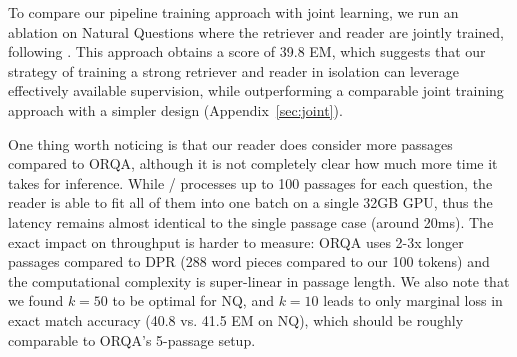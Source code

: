 To compare our pipeline training approach with joint learning, we run an ablation on Natural Questions where the retriever and reader are jointly trained, following \citet{lee2019latent}.
This approach obtains a score of 39.8 EM, which suggests that our strategy of training a strong retriever and reader in isolation can leverage effectively available supervision, while outperforming a comparable joint training approach with a simpler design (Appendix~\ref{sec:joint}).

One thing worth noticing is that our reader does consider more passages compared to ORQA, although it is not completely clear how much more time it takes for inference. 
While \model/ processes up to 100 passages for each question, the reader is able to fit all of them into one batch on a single 32GB GPU, thus the latency remains almost identical to the single passage case (around 20ms).
The exact impact on throughput is harder to measure: ORQA uses 2-3x longer passages compared to DPR (288 word pieces compared to our 100 tokens) and the computational complexity is super-linear in passage length. We also note that we found $k=50$ to be optimal for NQ, and $k=10$ leads to only marginal loss in exact match accuracy (40.8 vs. 41.5 EM on NQ), which should be roughly comparable to ORQA's 5-passage setup.




